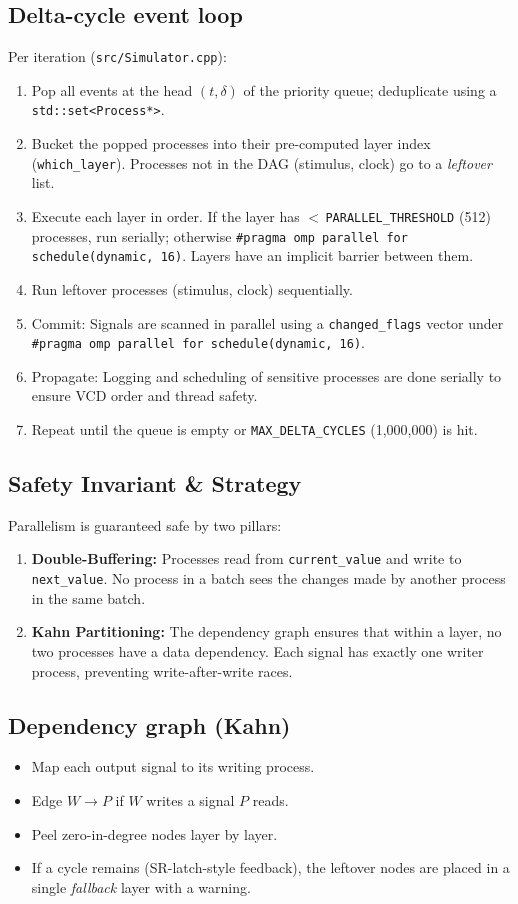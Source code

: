 \documentclass[9pt,a4paper]{article}
\begin{document}
\subsection{Delta-cycle event loop}
Per iteration (\texttt{src/Simulator.cpp}):
\begin{enumerate}[leftmargin=1.5em,itemsep=2pt]
  \item Pop all events at the head $(t,\delta)$ of the priority queue; deduplicate using a \texttt{std::set<Process*>}.
  \item Bucket the popped processes into their pre-computed layer index (\texttt{which\_layer}). Processes not in the DAG (stimulus, clock) go to a \emph{leftover} list.
  \item Execute each layer in order. If the layer has $<$\,\texttt{PARALLEL\_THRESHOLD} (512) processes, run serially; otherwise \texttt{\#pragma omp parallel for schedule(dynamic, 16)}. Layers have an implicit barrier between them.
  \item Run leftover processes (stimulus, clock) sequentially.
  \item Commit: Signals are scanned in parallel using a \texttt{changed\_flags} vector under \texttt{\#pragma omp parallel for schedule(dynamic, 16)}.
  \item Propagate: Logging and scheduling of sensitive processes are done serially to ensure VCD order and thread safety.
  \item Repeat until the queue is empty or \texttt{MAX\_DELTA\_CYCLES} (1{,}000{,}000) is hit.
\end{enumerate}

\subsection{Safety Invariant \& Strategy}
Parallelism is guaranteed safe by two pillars:
\begin{enumerate}
    \item \textbf{Double-Buffering:} Processes read from \texttt{current\_value} and write to \texttt{next\_value}. No process in a batch sees the changes made by another process in the same batch.
    \item \textbf{Kahn Partitioning:} The dependency graph ensures that within a layer, no two processes have a data dependency. Each signal has exactly one writer process, preventing write-after-write races.
\end{enumerate}

\subsection{Dependency graph (Kahn)}
\begin{itemize}[leftmargin=1.5em,itemsep=1pt]
  \item Map each output signal to its writing process.
  \item Edge $W \to P$ if $W$ writes a signal $P$ reads.
  \item Peel zero-in-degree nodes layer by layer.
  \item If a cycle remains (SR-latch-style feedback), the leftover nodes are placed in a single \emph{fallback} layer with a warning.
\end{itemize}
\end{document}
